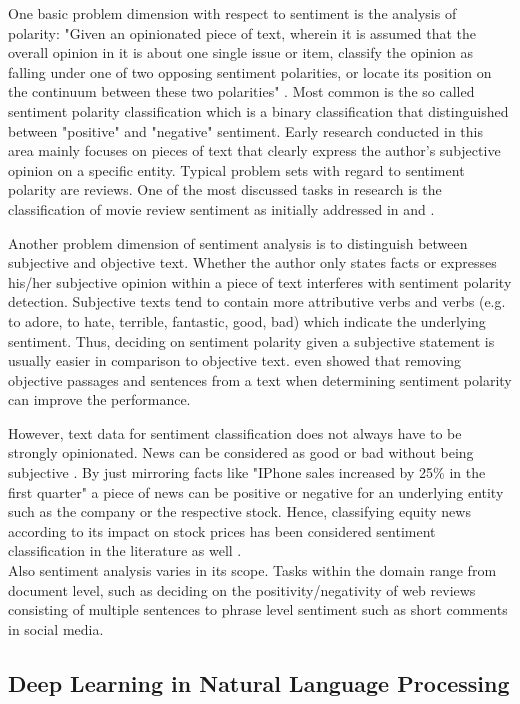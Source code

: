 \documentclass[a4paper,12pt]{article}%
\begin{document}
One basic problem dimension with respect to sentiment is the analysis of polarity: "Given an opinionated piece of text, wherein it is assumed that the overall opinion in it is about one single issue or item, classify the opinion as falling under one of two opposing sentiment polarities, or locate its position on the continuum between these two polarities" \citep{Pang.2008}. Most common is the so called sentiment polarity classification which is a binary classification that distinguished between "positive" and "negative" sentiment. Early research conducted in this area mainly focuses on pieces of text that clearly express the author's subjective opinion on a specific entity. Typical problem sets with regard to sentiment polarity are reviews. One of the most discussed tasks in research is the classification of movie review sentiment as initially addressed in \citet{Pang2002} and \citet{Turney2002}.

Another problem dimension of sentiment analysis is to distinguish between subjective and objective text. Whether the author only states facts or expresses his/her subjective opinion within a piece of text interferes with sentiment polarity detection. Subjective texts tend to contain more attributive verbs and verbs (e.g. to adore, to hate, terrible, fantastic, good, bad) which indicate the underlying sentiment. Thus, deciding on sentiment polarity given a subjective statement is usually easier in comparison to objective text. \citet{Pang2004} even showed that removing objective passages and sentences from a text when determining sentiment polarity can improve the performance.

However, text data for sentiment classification does not always have to be strongly opinionated. News can be considered as good or bad without being subjective \citep{Pang.2008}. By just mirroring facts like "IPhone sales increased by 25\% in the first quarter" a piece of news can be positive or negative for an underlying entity such as the company or the respective stock. Hence, classifying equity news according to its impact on stock prices has been considered sentiment classification in the literature as well \citep{Koppel2006}.\\

Also sentiment analysis varies in its scope. Tasks within the domain range from document level, such as deciding on the positivity/negativity of web reviews consisting of multiple sentences to phrase level sentiment such as short comments in social media.
\subsection{Deep Learning in Natural Language Processing}
\end{document}
